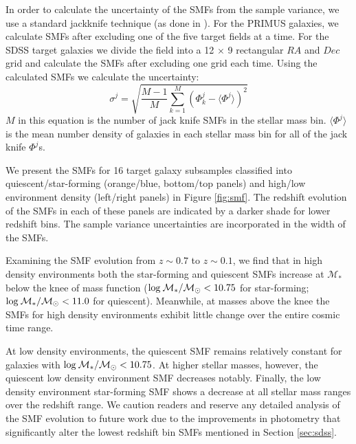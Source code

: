 \documentclass{emulateapj}
\begin{document}
In order to calculate the uncertainty of the SMFs from the sample variance, we use a standard jackknife technique (as done in \cite{Moustakas:2013aa}). For the PRIMUS galaxies, we calculate SMFs after excluding one of the five target fields at a time. For the SDSS target galaxies we divide the field into a 12 $\times$ 9 rectangular $RA$ and $Dec$ grid and calculate the SMFs after excluding one grid each time. Using the calculated SMFs we calculate the uncertainty: 
\begin{equation}
\sigma^j = \sqrt{\frac{M-1}{M} \sum\limits_{k=1}^{M} (\Phi^j_k - \langle \Phi^j \rangle)^2}
\end{equation} 
$M$ in this equation is the number of jack knife SMFs in the stellar mass bin. $\langle \Phi^j \rangle$ is the mean number density of galaxies 
in each stellar mass bin for all of the jack knife $\Phi^j$s. 

We present the SMFs for 16 target galaxy subsamples classified into quiescent/star-forming (orange/blue, bottom/top panels) and high/low environment density (left/right panels) in Figure \ref{fig:smf}. The redshift evolution of the SMFs in each of these panels are indicated by a darker shade for lower redshift bins. The sample variance uncertainties are incorporated in the width of the SMFs. 

Examining the SMF evolution from $z \sim 0.7$ to $z \sim 0.1$, we find that in high density environments both the star-forming and quiescent SMFs increase at $\mathcal{M}_{*}$ below the knee of mass function ($\rm{log}\: \mathcal{M}_{*}/\mathcal{M}_{\odot} < 10.75$ for star-forming; $\rm{log}\: \mathcal{M}_{*}/\mathcal{M}_{\odot} < 11.0$ for quiescent). Meanwhile, at masses above the knee the SMFs for high density environments exhibit little change over the entire cosmic time range.

At low density environments, the quiescent SMF remains relatively constant for galaxies with $\rm{log}\: \mathcal{M}_{*}/\mathcal{M}_{\odot} < 10.75$. At higher stellar masses, however, the quiescent low density environment SMF decreases notably. Finally, the low density environment star-forming SMF shows a decrease at all stellar mass ranges over the redshift range. We caution readers and reserve any detailed analysis of the SMF evolution to future work due to the improvements in photometry that significantly alter the lowest redshift bin SMFs mentioned in Section \ref{sec:sdss}. 

\end{document}
